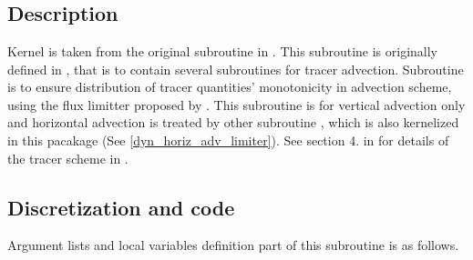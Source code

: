 \section{}
\label{dyn_vert_adv_limiter}

\subsection{Description}

Kernel  is taken from the original
subroutine  in \NICAM.
%
This subroutine is originally defined in , that is
to contain several subroutines for tracer advection.
%
Subroutine  is to ensure distribution of
tracer quantities' monotonicity in advection scheme, using the flux
limitter proposed by \cite{Thuburn:1996in}.
%
This subroutine is for vertical advection only and horizontal advection
is treated by other subroutine , which
is also kernelized in this pacakage (See \autoref{dyn_horiz_adv_limiter}).
%
See section 4. in \cite{Tomita2010ecmwf} for details of the tracer scheme in \NICAM.


\subsection{Discretization and code}

Argument lists and local variables definition part of this subroutine is
as follows.

